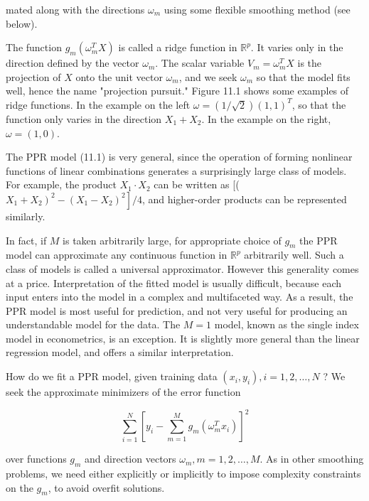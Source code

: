 \documentclass[10pt]{article}
\begin{document}
mated along with the directions $\omega_{m}$ using some flexible smoothing method (see below).

The function $g_{m}\left(\omega_{m}^{T} X\right)$ is called a ridge function in $\mathbb{R}^{p}$. It varies only in the direction defined by the vector $\omega_{m}$. The scalar variable $V_{m}=\omega_{m}^{T} X$ is the projection of $X$ onto the unit vector $\omega_{m}$, and we seek $\omega_{m}$ so that the model fits well, hence the name "projection pursuit." Figure 11.1 shows some examples of ridge functions. In the example on the left $\omega=(1 / \sqrt{2})(1,1)^{T}$, so that the function only varies in the direction $X_{1}+X_{2}$. In the example on the right, $\omega=(1,0)$.

The PPR model (11.1) is very general, since the operation of forming nonlinear functions of linear combinations generates a surprisingly large class of models. For example, the product $X_{1} \cdot X_{2}$ can be written as [( $X_{1}+ \left.\left.X_{2}\right)^{2}-\left(X_{1}-X_{2}\right)^{2}\right] / 4$, and higher-order products can be represented similarly.

In fact, if $M$ is taken arbitrarily large, for appropriate choice of $g_{m}$ the PPR model can approximate any continuous function in $\mathbb{R}^{p}$ arbitrarily well. Such a class of models is called a universal approximator. However this generality comes at a price. Interpretation of the fitted model is usually difficult, because each input enters into the model in a complex and multifaceted way. As a result, the PPR model is most useful for prediction, and not very useful for producing an understandable model for the data. The $M=1$ model, known as the single index model in econometrics, is an exception. It is slightly more general than the linear regression model, and offers a similar interpretation.

How do we fit a PPR model, given training data $\left(x_{i}, y_{i}\right), i=1,2, \ldots, N$ ? We seek the approximate minimizers of the error function


\begin{equation*}
\sum_{i=1}^{N}\left[y_{i}-\sum_{m=1}^{M} g_{m}\left(\omega_{m}^{T} x_{i}\right)\right]^{2} \tag{11.2}
\end{equation*}


over functions $g_{m}$ and direction vectors $\omega_{m}, m=1,2, \ldots, M$. As in other smoothing problems, we need either explicitly or implicitly to impose complexity constraints on the $g_{m}$, to avoid overfit solutions.
\end{document}
